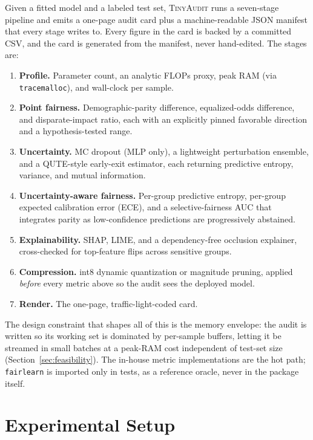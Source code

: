 \documentclass[11pt]{article}
\begin{document}
Given a fitted model and a labeled test set, \textsc{TinyAudit} runs a
seven-stage pipeline and emits a one-page audit card plus a machine-readable JSON
manifest that every stage writes to. Every figure in the card is backed by a
committed CSV, and the card is generated from the manifest, never hand-edited.
The stages are:
\begin{enumerate}
    \item \textbf{Profile.} Parameter count, an analytic FLOPs proxy, peak RAM
    (via \texttt{tracemalloc}), and wall-clock per sample.
    \item \textbf{Point fairness.} Demographic-parity difference, equalized-odds
    difference, and disparate-impact ratio, each with an explicitly pinned
    favorable direction and a hypothesis-tested range.
    \item \textbf{Uncertainty.} MC dropout (MLP only), a lightweight
    perturbation ensemble, and a QUTE-style early-exit estimator, each returning
    predictive entropy, variance, and mutual information.
    \item \textbf{Uncertainty-aware fairness.} Per-group predictive entropy,
    per-group expected calibration error (ECE), and a selective-fairness AUC that
    integrates parity as low-confidence predictions are progressively abstained.
    \item \textbf{Explainability.} SHAP, LIME, and a dependency-free occlusion
    explainer, cross-checked for top-feature flips across sensitive groups.
    \item \textbf{Compression.} int8 dynamic quantization or magnitude pruning,
    applied \emph{before} every metric above so the audit sees the deployed model.
    \item \textbf{Render.} The one-page, traffic-light-coded card.
\end{enumerate}
The design constraint that shapes all of this is the memory envelope: the audit
is written so its working set is dominated by per-sample buffers, letting it be
streamed in small batches at a peak-RAM cost independent of test-set size
(Section~\ref{sec:feasibility}). The in-house metric implementations are the hot
path; \texttt{fairlearn} is imported only in tests, as a reference oracle, never
in the package itself.

\section{Experimental Setup}
\label{sec:setup}
\end{document}
